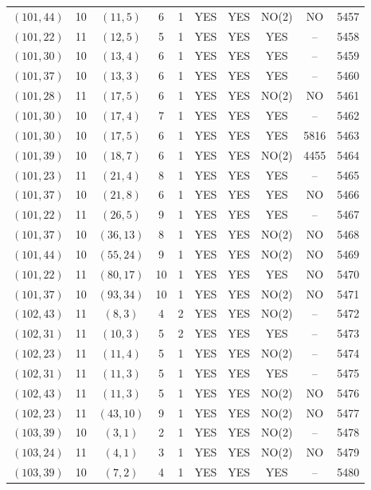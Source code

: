 \begin{longtable}{|c|c|c|c|c|c|c|c|c|c|}
$(101, 44)$ & 10 & $(11, 5)$ & 6 & 1 & YES & YES & NO(2) & NO & 5457\\
$(101, 22)$ & 11 & $(12, 5)$ & 5 & 1 & YES & YES & YES & -- & 5458\\
$(101, 30)$ & 10 & $(13, 4)$ & 6 & 1 & YES & YES & YES & -- & 5459\\
$(101, 37)$ & 10 & $(13, 3)$ & 6 & 1 & YES & YES & YES & -- & 5460\\
$(101, 28)$ & 11 & $(17, 5)$ & 6 & 1 & YES & YES & NO(2) & NO & 5461\\
$(101, 30)$ & 10 & $(17, 4)$ & 7 & 1 & YES & YES & YES & -- & 5462\\
$(101, 30)$ & 10 & $(17, 5)$ & 6 & 1 & YES & YES & YES & 5816 & 5463\\
$(101, 39)$ & 10 & $(18, 7)$ & 6 & 1 & YES & YES & NO(2) & 4455 & 5464\\
$(101, 23)$ & 11 & $(21, 4)$ & 8 & 1 & YES & YES & YES & -- & 5465\\
$(101, 37)$ & 10 & $(21, 8)$ & 6 & 1 & YES & YES & YES & NO & 5466\\
$(101, 22)$ & 11 & $(26, 5)$ & 9 & 1 & YES & YES & YES & -- & 5467\\
$(101, 37)$ & 10 & $(36, 13)$ & 8 & 1 & YES & YES & NO(2) & NO & 5468\\
$(101, 44)$ & 10 & $(55, 24)$ & 9 & 1 & YES & YES & NO(2) & NO & 5469\\
$(101, 22)$ & 11 & $(80, 17)$ & 10 & 1 & YES & YES & YES & NO & 5470\\
$(101, 37)$ & 10 & $(93, 34)$ & 10 & 1 & YES & YES & NO(2) & NO & 5471\\
$(102, 43)$ & 11 & $(8, 3)$ & 4 & 2 & YES & YES & NO(2) & -- & 5472\\
$(102, 31)$ & 11 & $(10, 3)$ & 5 & 2 & YES & YES & YES & -- & 5473\\
$(102, 23)$ & 11 & $(11, 4)$ & 5 & 1 & YES & YES & NO(2) & -- & 5474\\
$(102, 31)$ & 11 & $(11, 3)$ & 5 & 1 & YES & YES & YES & -- & 5475\\
$(102, 43)$ & 11 & $(11, 3)$ & 5 & 1 & YES & YES & NO(2) & NO & 5476\\
$(102, 23)$ & 11 & $(43, 10)$ & 9 & 1 & YES & YES & NO(2) & NO & 5477\\
$(103, 39)$ & 10 & $(3, 1)$ & 2 & 1 & YES & YES & NO(2) & -- & 5478\\
$(103, 24)$ & 11 & $(4, 1)$ & 3 & 1 & YES & YES & NO(2) & NO & 5479\\
$(103, 39)$ & 10 & $(7, 2)$ & 4 & 1 & YES & YES & YES & -- & 5480\\

\end{longtable}

